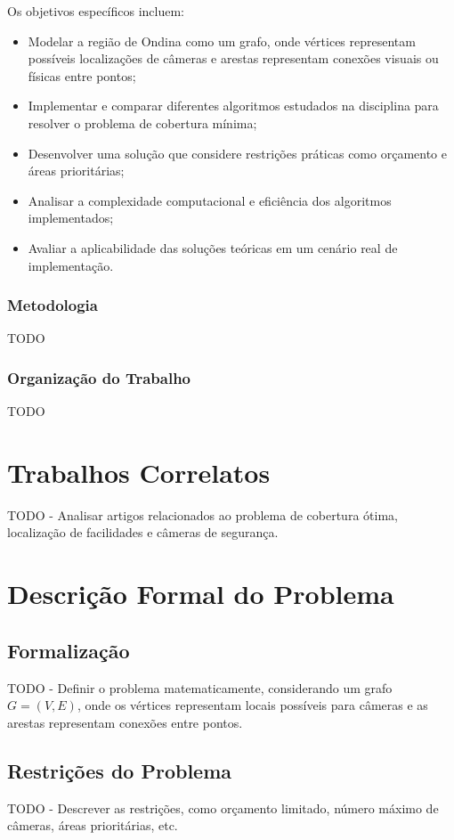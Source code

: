 \documentclass[12pt, a4paper]{report}
\begin{document}
Os objetivos específicos incluem:
\begin{itemize}
    \item Modelar a região de Ondina como um grafo, onde vértices representam possíveis localizações de câmeras e arestas representam conexões visuais ou físicas entre pontos;
    \item Implementar e comparar diferentes algoritmos estudados na disciplina para resolver o problema de cobertura mínima;
    \item Desenvolver uma solução que considere restrições práticas como orçamento e áreas prioritárias;
    \item Analisar a complexidade computacional e eficiência dos algoritmos implementados;
    \item Avaliar a aplicabilidade das soluções teóricas em um cenário real de implementação.
\end{itemize}

\subsection*{Metodologia}
TODO

\subsection*{Organização do Trabalho}
TODO

\chapter{Trabalhos Correlatos}
TODO - Analisar artigos relacionados ao problema de cobertura ótima, localização de facilidades e câmeras de segurança.

\chapter{Descrição Formal do Problema}

\section{Formalização}
TODO - Definir o problema matematicamente, considerando um grafo \(G = (V, E)\), onde os vértices representam locais possíveis para câmeras e as arestas representam conexões entre pontos.

\section{Restrições do Problema}
TODO - Descrever as restrições, como orçamento limitado, número máximo de câmeras, áreas prioritárias, etc.
\end{document}
